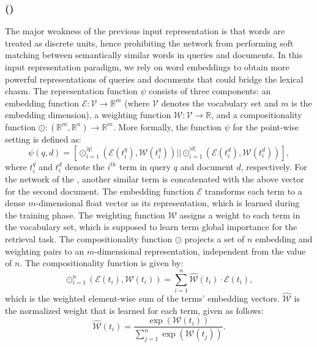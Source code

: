 \subsubsection{\label{sec:feedthree}\Feedthree (\fthree)}
The major weakness of the previous input representation is that words are treated as discrete units, hence prohibiting the network from performing soft matching between semantically similar words in queries and documents. In this input representation paradigm, we rely on word embeddings to obtain more powerful representations of queries and documents that could bridge the lexical chasm. %
The representation function $\psi$ consists of three components: an embedding function $\mathcal{E}: \mathcal{V} \rightarrow \mathbb{R}^{m}$ (where $\mathcal{V}$ denotes the vocabulary set and $m$ is the embedding dimension), a weighting function $\mathcal{W}: \mathcal{V} \rightarrow \mathbb{R}$, and a compositionality function $\odot: (\mathbb{R}^{m}, \mathbb{R}^{n}) \rightarrow \mathbb{R}^{m}$. More formally, the function $\psi$ for the point-wise setting is defined as:
\begin{equation}
\psi(q, d) = [\odot_{i=1}^{|q|}(\mathcal{E}(t_i^q), \mathcal{W}(t_i^q)) || \odot_{i=1}^{|d|} (\mathcal{E}(t_i^d), \mathcal{W}(t_i^d))],
\end{equation}
where $t_i^q$ and $t_i^d$ denote the $i^{th}$ term in query $q$ and document $d$, respectively. 
For the network of the \modelthree, another similar term is concatenated with the above vector for the second document. The embedding function $\mathcal{E}$ transforms each term to a dense $m$-dimensional float vector as its representation, which is learned during the training phase. The weighting function $\mathcal{W}$ assigns a weight to each term in the vocabulary set, which is supposed to learn term global importance for the retrieval task. The compositionality function $\odot$ projects a set of $n$ embedding and weighting pairs to an $m$-dimensional representation, independent from the value of $n$. The compositionality function is given by:
\begin{equation}
\odot_{i=1}^n(\mathcal{E}(t_i), \mathcal{W}(t_i)) = \sum_{i=1}^n \widehat{\mathcal{W}}(t_i)\cdot \mathcal{E}(t_i),
\end{equation}
which is the weighted element-wise sum of the terms' embedding vectors. $\widehat{\mathcal{W}}$ is the normalized weight that is learned for each term, given as follows:
\begin{equation}
\widehat{\mathcal{W}}(t_i) = \frac{\exp(\mathcal{W}(t_i))}{\sum_{j=1}^n{ \exp(\mathcal{W}(t_j))}}.
\end{equation}

